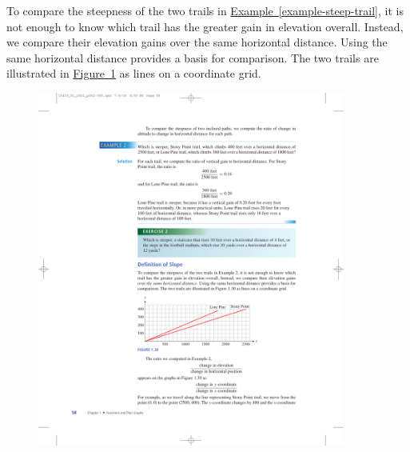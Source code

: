 \documentclass[10pt,]{book}
\theoremstyle{plain}
\theoremstyle{definition}
\theoremstyle{definition}
\theoremstyle{definition}
\theoremstyle{definition}
\theoremstyle{definition}
\numberwithin{equation}{section}
\begin{document}
    To compare the steepness of the two trails in \hyperref[example-steep-trail]{Example~\ref{example-steep-trail}}, it is not enough to know which trail has the greater gain in elevation overall. Instead, we compare their elevation gains over the same horizontal distance. Using the same horizontal distance provides a basis for comparison. The two trails are illustrated in \hyperref[fig-trail-climb-grid]{Figure~\ref{fig-trail-climb-grid}} as lines on a coordinate grid.
%
\leavevmode%
\begin{figure}
\centering
\includegraphics[width=0.90\textwidth,]{images/fig-trail-climb-grid.pdf}\caption{\label{fig-trail-climb-grid}}
\end{figure}
\par
\end{document}
